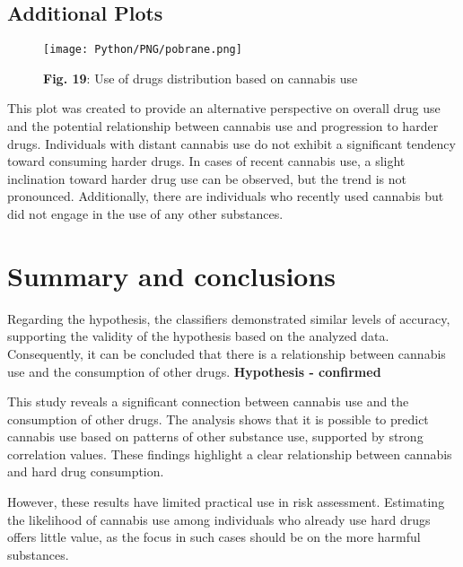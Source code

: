 \documentclass{article}
\begin{document}
\vspace{1cm}

\subsection{Additional Plots}

\begin{figure}[!h]
    \centering
    \texttt{[image: Python/PNG/pobrane.png]}
    \caption{\textbf{Fig. 19}: Use of drugs distribution based on cannabis use}
\end{figure}

\vspace{1cm}

\hspace{1cm}This plot was created to provide an alternative perspective on overall drug use and the potential relationship between cannabis use and progression to harder drugs. Individuals with distant cannabis use do not exhibit a significant tendency toward consuming harder drugs. In cases of recent cannabis use, a slight inclination toward harder drug use can be observed, but the trend is not pronounced. Additionally, there are individuals who recently used cannabis but did not engage in the use of any other substances.

\newpage

\section{Summary and conclusions}

\hspace{1cm}Regarding the hypothesis, the classifiers demonstrated similar levels of accuracy, supporting the validity of the hypothesis based on the analyzed data. Consequently, it can be concluded that there is a relationship between cannabis use and the consumption of other drugs. 
\newline
\textbf{Hypothesis - confirmed}

\hspace{1cm}This study reveals a significant connection between cannabis use and the consumption of other drugs. The analysis shows that it is possible to predict cannabis use based on patterns of other substance use, supported by strong correlation values. These findings highlight a clear relationship between cannabis and hard drug consumption.

However, these results have limited practical use in risk assessment. Estimating the likelihood of cannabis use among individuals who already use hard drugs offers little value, as the focus in such cases should be on the more harmful substances.
\end{document}
